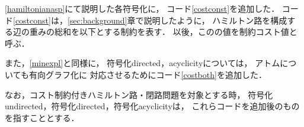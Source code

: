 
\ref{hamiltonianasp}にて説明した各符号化に，
コード\ref{costconst}を追加した．
コード\ref{costconst}は，\ref{sec:background}章で説明したように，
ハミルトン路を構成する辺の重みの総和を以下とする制約を表す．
以後，このの値を制約コスト値と呼ぶ．

また，\ref{minexpl}と同様に，
符号化directed，acyclicityについては，
アトムについても有向グラフ化に
対応させるためにコード\ref{costboth}を追加した．

なお，コスト制約付きハミルトン路・閉路問題を対象とする時，
符号化undirected，符号化directed，符号化acyclicityは，
これらコードを追加後のものを指すこととする．

